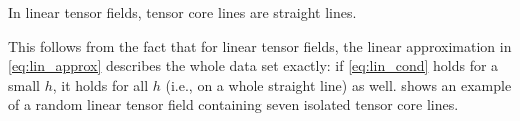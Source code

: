 %
\begin{theorem}
In linear tensor fields, tensor core lines are straight lines.
\end{theorem}
%
This follows from the fact that for linear tensor fields, the linear
approximation in \eqref{eq:lin_approx} describes the whole data set
exactly: if \eqref{eq:lin_cond} holds for a small $h$, it holds for all
$h$ (i.e., on a whole straight line) as well.
%
 shows an example of a random linear tensor field containing
seven isolated tensor core lines.
%
